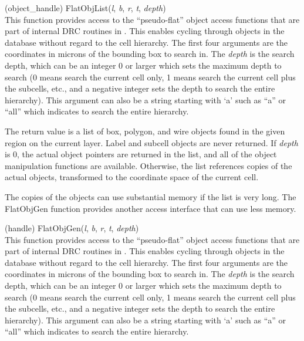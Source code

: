 \begin{description}
\item{(object\_handle) \vt FlatObjList({\it l\/}, {\it b\/}, {\it r\/},
   {\it t\/}, {\it depth\/})}\\
This function provides access to the ``pseudo-flat'' object access
functions that are part of internal DRC routines in {\Xic}.  This
enables cycling through objects in the database without regard to the
cell hierarchy.  The first four arguments are the coordinates in
microns of the bounding box to search in.  The {\it depth} is the
search depth, which can be an integer 0 or larger which sets the
maximum depth to search (0 means search the current cell only, 1 means
search the current cell plus the subcells, etc., and a negative
integer sets the depth to search the entire hierarchy).  This argument
can also be a string starting with `{\vt a}' such as ``{\vt a}'' or
``{\vt all}'' which indicates to search the entire hierarchy.

The return value is a list of box, polygon, and wire objects found in
the given region on the current layer.  Label and subcell objects are
never returned.  If {\it depth} is 0, the actual object pointers are
returned in the list, and all of the object manipulation functions are
available.  Otherwise, the list references copies of the actual
objects, transformed to the coordinate space of the current cell.

The copies of the objects can use substantial memory if the list is
very long.  The {\vt FlatObjGen} function provides another access
interface that can use less memory.

\item{(handle) \vt FlatObjGen({\it l\/}, {\it b\/}, {\it r\/},
   {\it t\/}, {\it depth\/})}\\
This function provides access to the ``pseudo-flat'' object access
functions that are part of internal DRC routines in {\Xic}.  This
enables cycling through objects in the database without regard to the
cell hierarchy.  The first four arguments are the coordinates in
microns of the bounding box to search in.  The {\it depth} is the
search depth, which can be an integer 0 or larger which sets the
maximum depth to search (0 means search the current cell only, 1 means
search the current cell plus the subcells, etc., and a negative
integer sets the depth to search the entire hierarchy).  This argument
can also be a string starting with `{\vt a}' such as ``{\vt a}'' or
``{\vt all}'' which indicates to search the entire hierarchy.


\end{description}
